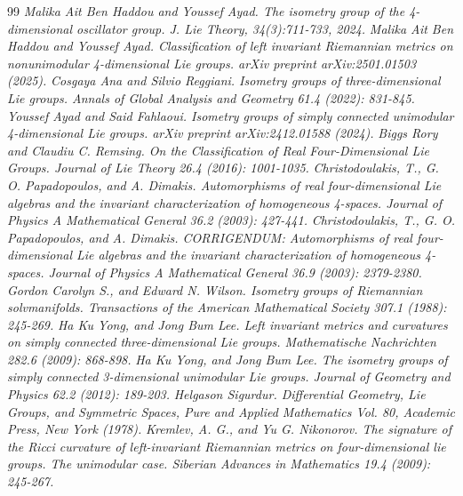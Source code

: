 \documentclass[12pt,a4paper,twoside]{article}
\theoremstyle{definition}
\begin{document}
\begin{thebibliography}{99}
\emph {Malika Ait Ben Haddou and Youssef Ayad. The isometry group of the 4-dimensional oscillator group. J. Lie Theory, 34(3):711-733, 2024.}
\emph{Malika Ait Ben Haddou and Youssef Ayad. Classification of left invariant Riemannian metrics on nonunimodular 4-dimensional Lie groups. arXiv preprint arXiv:2501.01503 (2025).}
\emph{Cosgaya Ana and Silvio Reggiani. Isometry groups of three-dimensional Lie groups. Annals of Global Analysis and Geometry 61.4 (2022): 831-845.}
\emph{Youssef Ayad and Said Fahlaoui. Isometry groups of simply connected unimodular 4-dimensional Lie groups. arXiv preprint arXiv:2412.01588 (2024).}
\emph{Biggs Rory and Claudiu C. Remsing. On the Classification of Real Four-Dimensional Lie Groups. Journal of Lie Theory 26.4 (2016): 1001-1035.}
\emph{Christodoulakis, T., G. O. Papadopoulos, and A. Dimakis. Automorphisms of real four-dimensional Lie algebras and the invariant characterization of homogeneous 4-spaces. Journal of Physics A Mathematical General 36.2 (2003): 427-441.}
\emph{Christodoulakis, T., G. O. Papadopoulos, and A. Dimakis. CORRIGENDUM: Automorphisms of real four-dimensional Lie algebras and the invariant characterization of homogeneous 4-spaces. Journal of Physics A Mathematical General 36.9 (2003): 2379-2380.}
\emph{Gordon Carolyn S., and Edward N. Wilson. Isometry groups of Riemannian solvmanifolds. Transactions of the American Mathematical Society 307.1 (1988): 245-269.}
\emph{Ha Ku Yong, and Jong Bum Lee. Left invariant metrics and curvatures on simply connected three-dimensional Lie groups. Mathematische Nachrichten 282.6 (2009): 868-898.}
\emph{Ha Ku Yong, and Jong Bum Lee. The isometry groups of simply connected 3-dimensional unimodular Lie groups. Journal of Geometry and Physics 62.2 (2012): 189-203.}
\emph{Helgason Sigurdur. Differential Geometry, Lie Groups, and Symmetric Spaces, Pure and Applied Mathematics Vol. 80, Academic Press, New York (1978).}
\emph{Kremlev, A. G., and Yu G. Nikonorov. The signature of the Ricci curvature of left-invariant Riemannian metrics on four-dimensional lie groups. The unimodular case. Siberian Advances in Mathematics 19.4 (2009): 245-267.}

\end{thebibliography}
\end{document}

